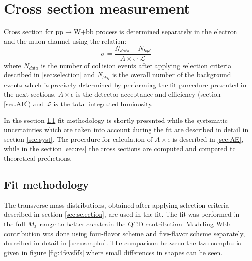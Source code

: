 \chapter{Cross section measurement} %

\label{Chapter7} %



Cross section for pp$\rightarrow$W+bb process is determined separately in the electron and the muon channel using the relation:
\begin{equation}
\sigma = \frac{N_{data}-N_{bgd}}{A\times \epsilon \cdot \mathcal{L}}
\label{equ:xsec}
\end{equation}
where $N_{data}$ is the number of collision events after applying selection criteria described in \ref{sec:selection} and $N_{bkg}$ is the overall number of the background events which is precisely determined by performing the fit procedure presented in the next sections. $A\times \epsilon$ is the detector acceptance and efficiency (section \ref{sec:AE}) and $\mathcal{L}$ is the total integrated luminosity. 
\par In the section \ref{sec:fit} fit methodology is shortly presented while the systematic uncertainties which are taken into account during the fit are described in detail in section \ref{sec:syst}. The procedure for calculation of $A\times \epsilon$ is described in \ref{sec:AE}, while in the section \ref{sec:res} the cross sections are computed and compared to theoretical predictions. 


\section{Fit methodology}
\label{sec:fit}

The transverse mass distributions, obtained after applying selection criteria described in section \ref{sec:selection}, are used in the fit. The fit was performed in the full $M_T$ range to better constrain the QCD contribution.  
Modeling Wbb contribution was done using four-flavor scheme and five-flavor scheme separately, described in detail in \ref{sec:samples}. The comparison between the two samples is given in figure \ref{fig:4fsvs5fs} where small differences in shapes can be seen.

